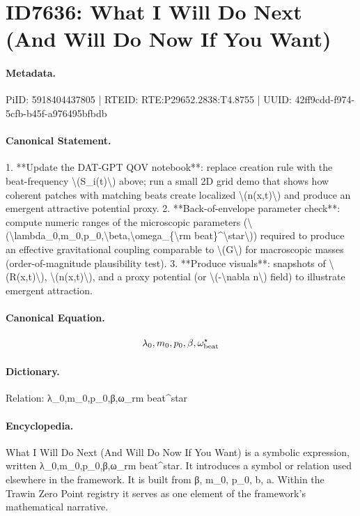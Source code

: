 \section*{ID7636: What I Will Do Next (And Will Do Now If You Want)}
\paragraph{Metadata.}
PiID: 5918404437805 | RTEID: RTE:P29652.2838:T4.8755 | UUID: 42ff9cdd-f974-5cfb-b45f-a976495bfbdb

\paragraph{Canonical Statement.}
1. **Update the DAT-GPT QOV notebook**: replace creation rule with the beat-frequency \textbackslash{}(S\_i(t)\textbackslash{}) above; run a small 2D grid demo that shows how coherent patches with matching beats create localized \textbackslash{}(n(x,t)\textbackslash{}) and produce an emergent attractive potential proxy. 2. **Back-of-envelope parameter check**: compute numeric ranges of the microscopic parameters (\textbackslash{}(\textbackslash{}lambda\_0,m\_0,p\_0,\textbackslash{}beta,\textbackslash{}omega\_\{\textbackslash{}rm beat\}\textasciicircum{}\textbackslash{}star\textbackslash{})) required to produce an effective gravitational coupling comparable to \textbackslash{}(G\textbackslash{}) for macroscopic masses (order-of-magnitude plausibility test). 3. **Produce visuals**: snapshots of \textbackslash{}(R(x,t)\textbackslash{}), \textbackslash{}(n(x,t)\textbackslash{}), and a proxy potential (or \textbackslash{}(-\textbackslash{}nabla n\textbackslash{}) field) to illustrate emergent attraction.

\paragraph{Canonical Equation.}
\[
\lambda_0,m_0,p_0,\beta,\omega_{\rm beat}^\star
\]

\paragraph{Dictionary.}
Relation: λ\_0,m\_0,p\_0,β,ω\_rm beat\textasciicircum{}star

\paragraph{Encyclopedia.}
What I Will Do Next (And Will Do Now If You Want) is a symbolic expression, written λ\_0,m\_0,p\_0,β,ω\_rm beat\textasciicircum{}star. It introduces a symbol or relation used elsewhere in the framework. It is built from β, m\_0, p\_0, b, a. Within the Trawin Zero Point registry it serves as one element of the framework's mathematical narrative.
